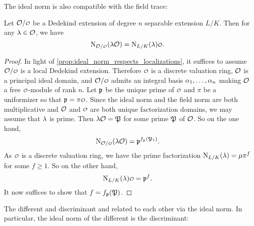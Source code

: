     The ideal norm is also compatible with the field trace:

    \begin{proposition}\label{prop:ideal_norm_respects_field_trace}
      Let $\mc{O}/\smc{O}$ be a Dedekind extension of degree $n$ separable extension $L/K$. Then for any $\lambda \in \mathcal{O}$, we have
      \[
        \Norm_{\mc{O}/\smc{O}}(\l\mc{O}) = \Norm_{L/K}(\l)\smc{O}.
      \]
    \end{proposition}
    \begin{proof}
      In light of \cref{prop:ideal_norm_respects_localizations}, it suffices to assume $\mc{O}/\smc{O}$ is a local Dedekind extension. Therefore $\smc{O}$ is a discrete valuation ring, $\mathcal{O}$ is a principal ideal domain, and $\mc{O}/\smc{O}$ admits an integral basis $\alpha_{1},\ldots,\alpha_{n}$ making $\mathcal{O}$ a free $\smc{O}$-module of rank $n$. Let $\mathfrak{p}$ be the unique prime of $\smc{O}$ and $\pi$ be a uniformizer so that $\mf{p} = \pi\smc{O}$. Since the ideal norm and the field norm are both multiplicative and $\mathcal{O}$ and $\smc{O}$ are both unique factorization domains, we may assume that $\lambda$ is prime. Then $\lambda\mathcal{O} = \mathfrak{P}$ for some prime $\mathfrak{P}$ of $\mathcal{O}$. So on the one hand,
      \[
        \Norm_{\mc{O}/\smc{O}}(\l\mc{O}) = \mf{p}^{f_{\mf{p}}(\mf{P}_{1})}.
      \]
      As $\smc{O}$ is a discrete valuation ring, we have the prime factorization $\operatorname{\mathrm{N}}_{L/K}(\lambda) = \mu\pi^{f}$ for some $f \ge 1$. So on the other hand,
      \[
        \Norm_{L/K}(\l)\smc{O} = \mf{p}^{f}.
      \]
      It now suffices to show that $f = f_{\mathfrak{p}}(\mathfrak{P})$.
    \end{proof}

    The different and discriminant and related to each other via the ideal norm. In particular, the ideal norm of the different is the discriminant:

